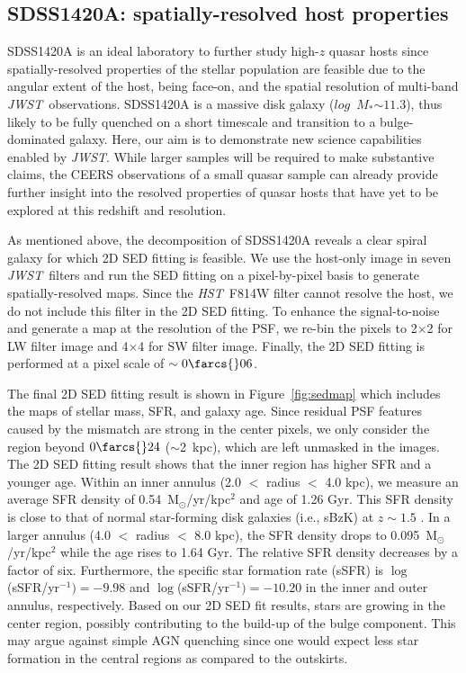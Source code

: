 \documentclass[twocolumn,]{aastex631}
\newcommand{\smass}{{$M_*$}}
\newcommand{\hst}{{\it HST}}
\newcommand{\jwst}{{\it JWST}}
\begin{document}
\subsection{SDSS1420A: spatially-resolved host properties}

SDSS1420A is an ideal laboratory to further study high-$z$ quasar hosts since spatially-resolved properties of the stellar population are feasible due to the angular extent of the host, being face-on, and the spatial resolution of multi-band \jwst\ observations. SDSS1420A is a massive disk galaxy ($log$~\smass$\sim11.3$), thus likely to be fully quenched on a short timescale and transition to a bulge-dominated galaxy. Here, our aim is to demonstrate new science capabilities enabled by \jwst. While larger samples will be required to make substantive claims, the CEERS observations of a small quasar sample can already provide further insight into the resolved properties of quasar hosts that have yet to be explored at this redshift and resolution.

As mentioned above, the decomposition of SDSS1420A reveals a clear spiral galaxy for which 2D SED fitting is feasible. We use the host-only image in seven \jwst\ filters and run the SED fitting on a pixel-by-pixel basis to generate spatially-resolved maps. Since the \hst\ F814W filter cannot resolve the host, we do not include this filter in the 2D SED fitting. To enhance the signal-to-noise and generate a map at the resolution of the PSF, we re-bin the pixels to 2$\times$2 for LW filter image and 4$\times$4 for SW filter image. Finally, the 2D SED fitting is performed at a pixel scale of $\sim0\farcs{}06$.

The final 2D SED fitting result is shown in Figure~\ref{fig:sedmap} which includes the maps of stellar mass, SFR, and galaxy age. Since residual PSF features caused by the mismatch are strong in the center pixels, we only consider the region beyond $0\farcs{}24$ ($\sim$2~kpc), which are left unmasked in the images. The 2D SED fitting result shows that the inner region has higher SFR and a younger age. 
Within an inner annulus (2.0 $<$ radius $<$ 4.0 kpc), we measure an average SFR density of 0.54~M$_{\odot}$/yr/kpc$^2$ and age of 1.26 Gyr. This SFR density is close to that of normal star-forming disk galaxies (i.e., sBzK) at $z\sim1.5$ \citep{Daddi2010}. In a larger annulus (4.0 $<$ radius $<$ 8.0 kpc), the SFR density drops to 0.095~M$_{\odot}$/yr/kpc$^2$ while the age rises to 1.64 Gyr. The relative SFR density decreases by a factor of six. Furthermore, the specific star formation rate (sSFR) is $\log$(sSFR/yr$^{-1})=-9.98$ and  $\log$(sSFR/yr$^{-1})=-10.20$ in the inner and outer annulus, respectively.
Based on our 2D SED fit results, stars are growing in the center region, possibly contributing to the build-up of the bulge component. This may argue against simple AGN quenching since one would expect less star formation in the central regions as compared to the outskirts. 
\end{document}
